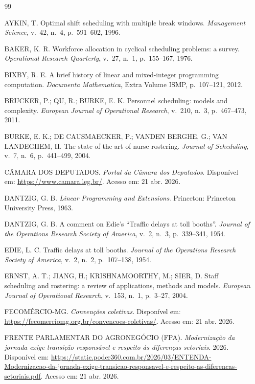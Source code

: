 \documentclass[12pt,a4paper]{article}
\begin{document}
\begin{thebibliography}{99}

 AYKIN, T. Optimal shift scheduling with multiple break
windows. \emph{Management Science}, v.~42, n.~4, p.~591--602, 1996.

 BAKER, K. R. Workforce allocation in cyclical scheduling
problems: a survey. \emph{Operational Research Quarterly}, v.~27, n.~1,
p.~155--167, 1976.

 BIXBY, R. E. A brief history of linear and mixed-integer
programming computation. \emph{Documenta Mathematica}, Extra Volume ISMP,
p.~107--121, 2012.

 BRUCKER, P.; QU, R.; BURKE, E. K. Personnel scheduling:
models and complexity. \emph{European Journal of Operational Research},
v.~210, n.~3, p.~467--473, 2011.

 BURKE, E. K.; DE CAUSMAECKER, P.; VANDEN BERGHE, G.; VAN
LANDEGHEM, H. The state of the art of nurse rostering. \emph{Journal of
Scheduling}, v.~7, n.~6, p.~441--499, 2004.

 CÂMARA DOS DEPUTADOS. \emph{Portal da Câmara dos Deputados}.
Disponível em: \url{https://www.camara.leg.br/}. Acesso em: 21 abr. 2026.

 DANTZIG, G. B. \emph{Linear Programming and
Extensions}. Princeton: Princeton University Press, 1963.

 DANTZIG, G. B. A comment on Edie's ``Traffic delays at
toll booths''. \emph{Journal of the Operations Research Society of America},
v.~2, n.~3, p.~339--341, 1954.

 EDIE, L. C. Traffic delays at toll booths. \emph{Journal
of the Operations Research Society of America}, v.~2, n.~2, p.~107--138,
1954.

 ERNST, A. T.; JIANG, H.; KRISHNAMOORTHY, M.; SIER, D.
Staff scheduling and rostering: a review of applications, methods and
models. \emph{European Journal of Operational Research}, v.~153, n.~1,
p.~3--27, 2004.

 FECOMÉRCIO-MG. \emph{Convenções coletivas}. Disponível
em: \url{https://fecomerciomg.org.br/convencoes-coletivas/}. Acesso em: 21
abr. 2026.

 FRENTE PARLAMENTAR DO AGRONEGÓCIO (FPA). \emph{Modernização da
jornada exige transição responsável e respeito às diferenças setoriais}.
2026. Disponível em:
\url{https://static.poder360.com.br/2026/03/ENTENDA-Modernizacao-da-jornada-exige-transicao-responsavel-e-respeito-as-diferencas-setoriais.pdf}.
Acesso em: 21 abr. 2026.


\end{thebibliography}
\end{document}
